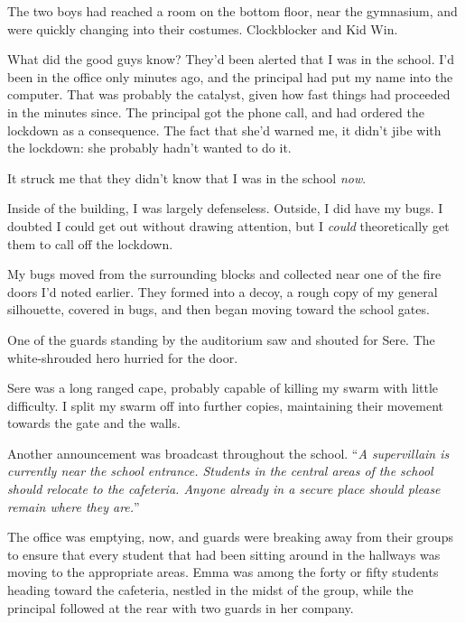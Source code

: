 The two boys had reached a room on the bottom floor, near the gymnasium, and were quickly changing into their costumes.  Clockblocker and Kid Win.



What did the good guys know?  They'd been alerted that I was in the school.  I'd been in the office only minutes ago, and the principal had put my name into the computer.  That was probably the catalyst, given how fast things had proceeded in the minutes since.  The principal got the phone call, and had ordered the lockdown as a consequence.  The fact that she'd warned me, it didn't jibe with the lockdown: she probably hadn't wanted to do it.



It struck me that they didn't know that I was in the school \emph{now}.



Inside of the building, I was largely defenseless.  Outside, I did have my bugs.  I doubted I could get out without drawing attention, but I \emph{could} theoretically get them to call off the lockdown.



My bugs moved from the surrounding blocks and collected near one of the fire doors I'd noted earlier.  They formed into a decoy, a rough copy of my general silhouette, covered in bugs, and then began moving toward the school gates.



One of the guards standing by the auditorium saw and shouted for Sere.  The white-shrouded hero hurried for the door.



Sere was a long ranged cape, probably capable of killing my swarm with little difficulty.  I split my swarm off into further copies, maintaining their movement towards the gate and the walls.



Another announcement was broadcast throughout the school.  ``\emph{A supervillain is currently near the school entrance.  Students in the central areas of the school should relocate to the cafeteria.  Anyone already in a secure place should please remain where they are.}''



The office was emptying, now, and guards were breaking away from their groups to ensure that every student that had been sitting around in the hallways was moving to the appropriate areas.  Emma was among the forty or fifty students heading toward the cafeteria, nestled in the midst of the group, while the principal followed at the rear with two guards in her company.



